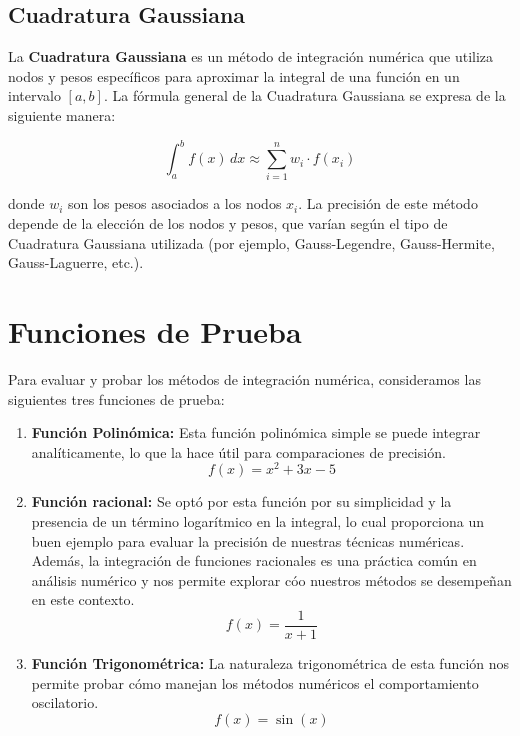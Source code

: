 \documentclass[a4paper]{article}
\begin{document}
    \subsection{Cuadratura Gaussiana}
    
    La \textbf{Cuadratura Gaussiana} es un método de integración numérica que utiliza nodos y pesos 
    específicos para aproximar la integral de una función en un intervalo $[a, b]$. La fórmula 
    general de la Cuadratura Gaussiana se expresa de la siguiente manera:
    
    \[
    \int_{a}^{b} f(x) \, dx \approx \sum_{i=1}^{n} w_i \cdot f(x_i)
    \]
    
    donde $w_i$ son los pesos asociados a los nodos $x_i$. La precisión de este método depende de 
    la elección de los nodos y pesos, que varían según el tipo de Cuadratura Gaussiana utilizada 
    (por ejemplo, Gauss-Legendre, Gauss-Hermite, Gauss-Laguerre, etc.).\cite{gauss_quad}
    

    \section{Funciones de Prueba}
	\label{sec:funciones}
    Para evaluar y probar los métodos de integración numérica, consideramos las siguientes tres 	
    funciones de prueba:

    \begin{enumerate}
    
      \item \textbf{Función Polinómica:}
       Esta función polinómica simple se puede integrar analíticamente, lo que la hace útil para 
       comparaciones de precisión.
      \begin{equation}
      f(x) = x^2 + 3x - 5
      \end{equation}
    
      \item \textbf{Función racional:}
       Se optó por esta función por su simplicidad y la presencia de un término logarítmico en la 	
       integral, lo cual proporciona un buen ejemplo para evaluar la precisión de nuestras técnicas 
       numéricas. Además, la integración de funciones racionales es una práctica común en análisis 
       numérico y nos permite explorar cóo nuestros métodos se desempeñan en este contexto.
      \begin{equation}
      f(x) = \frac{1}{x + 1}
      \end{equation}

       \item \textbf{Función Trigonométrica:}
       La naturaleza trigonométrica de esta función nos permite probar cómo manejan los métodos
       numéricos el comportamiento oscilatorio.
      \begin{equation}
      f(x) = \sin(x)
      \end{equation}
    
    \end{enumerate}
\end{document}
